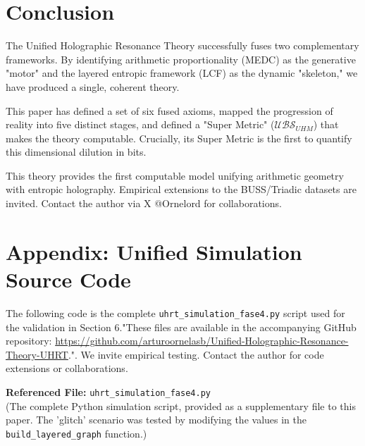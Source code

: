 \documentclass[11pt, a4paper]{article}
\begin{document}
		
		\section{Conclusion}
		
		The Unified Holographic Resonance Theory successfully fuses two complementary frameworks. By identifying arithmetic proportionality (MEDC) as the generative "motor" and the layered entropic framework (LCF) as the dynamic "skeleton," we have produced a single, coherent theory.
		
		This paper has defined a set of six fused axioms, mapped the progression of reality into five distinct stages, and defined a "Super Metric" ($\mathcal{UBS}_{UHM}$) that makes the theory computable. Crucially, its Super Metric is the first to quantify this dimensional dilution in bits.
		
		This theory provides the first computable model unifying arithmetic geometry with entropic holography. Empirical extensions to the BUSS/Triadic datasets are invited. Contact the author via X @Ornelord for collaborations.
		
		
	
		
		\appendix
		\section{Appendix: Unified Simulation Source Code}
		The following code is the complete \verb|uhrt_simulation_fase4.py| script used for the validation in Section 6."These files are available in the accompanying GitHub repository: \url{https://github.com/arturoornelasb/Unified-Holographic-Resonance-Theory-UHRT}.". We invite empirical testing. Contact the author for code extensions or collaborations.
		
		
		
		\begin{codereference}
			\centering\medskip
			\textbf{Referenced File:} \verb|uhrt_simulation_fase4.py| \\
			\small (The complete Python simulation script, provided as a 
			supplementary file to this paper. The 'glitch' scenario 
			was tested by modifying the values in the \texttt{build\_layered\_graph} function.)
			\medskip
		\end{codereference}
	
		
		
\end{document}
